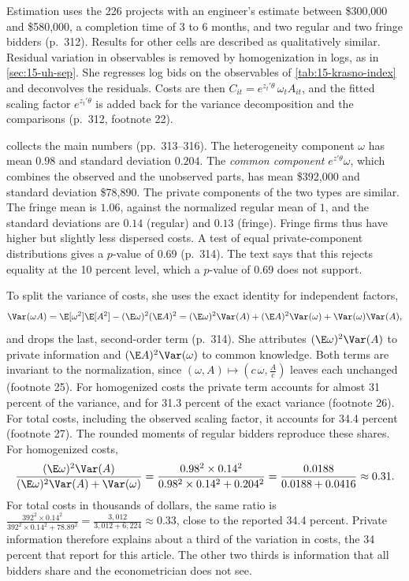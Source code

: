 Estimation uses the 226 projects with an engineer's estimate between \$300,000 and \$580,000, a
completion time of 3 to 6 months, and two regular and two fringe bidders (p.~312). Results for other
cells are described as qualitatively similar. Residual variation in observables is removed by
homogenization in logs, as in \cref{sec:15-uh-sep}. She regresses log bids on the observables of
\cref{tab:15-krasno-index} and deconvolves the residuals. Costs are then
$C_{it}=e^{z_t'\theta}\,\omega_tA_{it}$, and the fitted scaling factor $e^{z_t'\theta}$ is added back
for the variance decomposition and the comparisons (p.~312, footnote 22).

 collects the main numbers (pp.~313--316). The heterogeneity component
$\omega$ has mean $0.98$ and standard deviation $0.204$. The \emph{common component}
$e^{z'\theta}\omega$, which combines the observed and the unobserved parts, has mean \$392,000 and
standard deviation \$78,890. The private components of the two types are similar. The fringe mean is
$1.06$, against the normalized regular mean of $1$, and the standard deviations are $0.14$ (regular)
and $0.13$ (fringe). Fringe firms thus have higher but slightly less dispersed costs. A test of equal
private-component distributions gives a $p$-value of 0.69 (p.~314). The text says that this rejects
equality at the 10 percent level, which a $p$-value of 0.69 does not support.

To split the variance of costs, she uses the exact identity for independent factors,
\[
\Var(\omega A)=\E[\omega^2]\E[A^2]-(\E\omega)^2(\E A)^2=(\E\omega)^2\Var(A)+(\E A)^2\Var(\omega)+\Var(\omega)\Var(A),
\]
and drops the last, second-order term (p.~314). She attributes $(\E\omega)^2\Var(A)$ to private
information and $(\E A)^2\Var(\omega)$ to common knowledge. Both terms are invariant to the
normalization, since $(\omega,A)\mapsto(c\,\omega,\frac{A}{c})$ leaves each unchanged (footnote 25).
For homogenized costs the private term accounts for almost 31 percent of the variance, and for 31.3
percent of the exact variance (footnote 26). For total costs, including the observed scaling factor,
it accounts for 34.4 percent (footnote 27). The rounded moments of regular bidders reproduce these
shares. For homogenized costs,
\[
\frac{(\E\omega)^2\Var(A)}{(\E\omega)^2\Var(A)+\Var(\omega)}
=\frac{0.98^2\times0.14^2}{0.98^2\times0.14^2+0.204^2}
=\frac{0.0188}{0.0188+0.0416}\approx0.31 .
\]
For total costs in thousands of dollars, the same ratio is
$\frac{392^2\times0.14^2}{392^2\times0.14^2+78.89^2}=\frac{3{,}012}{3{,}012+6{,}224}\approx0.33$, close
to the reported 34.4 percent. Private information therefore explains about a third of the variation
in costs, the 34 percent that \citet[p.~103]{HortacsuPerrigne2021} report for this article. The other
two thirds is information that all bidders share and the econometrician does not see.

